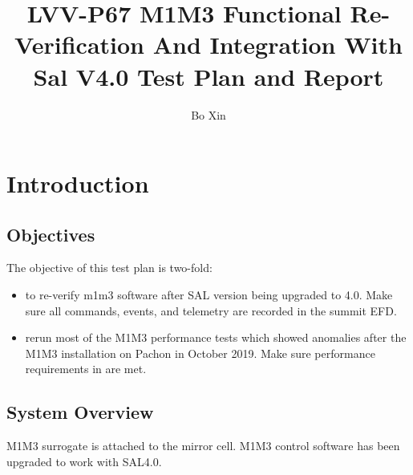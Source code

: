 \documentclass[SE,lsstdraft,STR,toc]{lsstdoc}
\providecommand{\tightlist}{
  \setlength{\itemsep}{0pt}\setlength{\parskip}{0pt}}
\begin{document}
\def\milestoneName{M1M3 Functional Re-Verification And Integration With Sal V4.0}
\def\milestoneId{LVV-P67}
\def\product{SIT-COM Integration}


\title{ LVV-P67 M1M3 Functional Re-Verification And Integration With Sal V4.0 Test Plan and Report}
\setDocRef{\lsstDocType-\lsstDocNum}
\date{\vcsdate}
\author{ Bo Xin }






\maketitle

\section{Introduction}
\label{sect:intro}


\subsection{Objectives}
\label{sect:objectives}

 The objective of this test plan is two-fold:

\begin{itemize}
\tightlist
\item
  to re-verify m1m3 software after SAL version being upgraded to 4.0.
  Make sure all commands, events, and telemetry are recorded in the
  summit EFD.
\item
  rerun most of the M1M3 performance tests which showed anomalies after
  the M1M3 {installation on Pachon in October 2019. Make sure
  performance requirements in  are met.}
\end{itemize}



\subsection{System Overview}
\label{sect:systemoverview}

 M1M3 surrogate is attached to the mirror cell. M1M3 control software has
been upgraded to work with SAL4.0.
\end{document}
